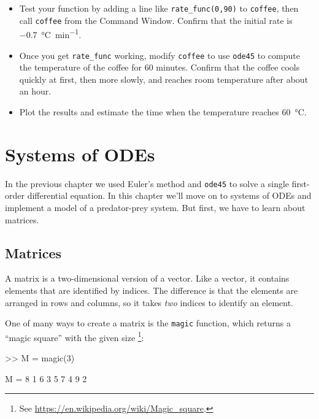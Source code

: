 \documentclass[
]{book}
\numberwithin{Answer}{chapter}
\numberwithin{Exercise}{chapter}
\begin{document}
\begin{ex}
\begin{itemize}
\item Test your function by adding a line like {\tt rate\_func(0,90)}
to {\tt coffee}, then call {\tt coffee} from the {\sf Command Window}.
Confirm that the initial rate is \SI{-0.7}{\celsius \per \minute}.

\item Once you get {\tt rate\_func} working, modify
{\tt coffee} to use {\tt ode45} to compute the temperature
of the coffee for 60 minutes.  Confirm that
the coffee cools quickly at first, then more slowly, and reaches
room temperature after about an hour.

\item Plot the results and estimate the time when the temperature reaches \SI{60}{\celsius}.

\end{itemize}

\end{ex}


\chapter{Systems of ODEs}

In the previous chapter we used Euler's method and {\tt ode45} to solve a single first-order differential equation.  In this chapter we'll move on to systems of ODEs and implement a model of a predator-prey system.  But first, we have to learn about matrices.


\section{Matrices}

A matrix is a two-dimensional version of a vector.  Like a vector,
it contains elements that are identified by indices.  The difference
is that the elements are arranged in rows and columns, so it takes
{\em two} indices to identify an element.


One of many ways to create a matrix is the {\tt magic} function,
which returns a ``magic square'' with the given size 
\footnote{See \url{https://en.wikipedia.org/wiki/Magic_square}.}:


\begin{code}
>> M = magic(3)

M =  8     1     6
     3     5     7
     4     9     2
\end{code}
\end{document}
